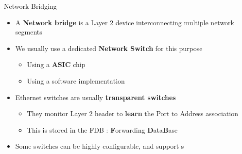 \begin{frame}{Network Bridging}
	\begin{itemize}
		\item A \textbf{Network bridge} is a Layer 2 device interconnecting multiple network segments
		\item We usually use a dedicated \textbf{Network Switch} for this purpose
			\begin{itemize}
				\item Using a \textbf{ASIC} chip
				\item Using a software implementation
			\end{itemize}
		\item Ethernet switches are usually \textbf{transparent switches}
			\begin{itemize}
				\item They monitor Layer 2 header to \textbf{learn} the Port to Address association
				\item This is stored in the FDB : \textbf{F}orwarding \textbf{D}ata\textbf{B}ase
			\end{itemize}
		\item Some switches can be highly configurable, and support s
	\end{itemize}
\end{frame}

